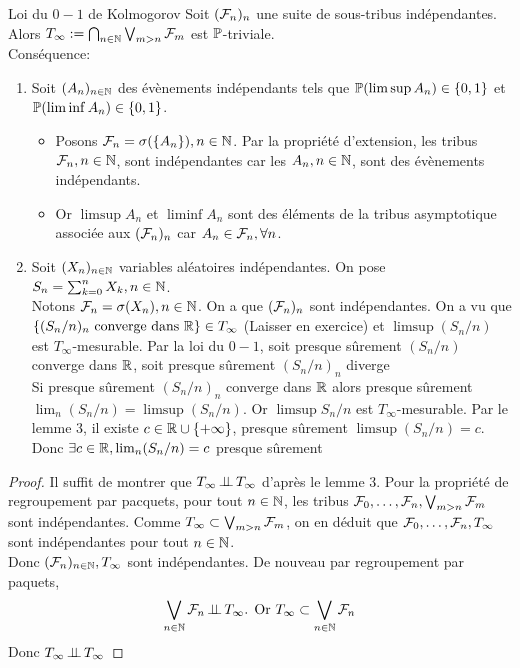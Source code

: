 \documentclass[]{report}
\begin{document}
    \begin{prop}{Loi du $0-1$ de Kolmogorov}{}
        Soit $(\mathcal{F}_n)_n$ une suite de sous-tribus indépendantes. Alors $T_\infty:=\bigcap_{n\in \mathbb{N}} \bigvee_{m>n} \mathcal{F}_m$ est $\mathbb{P}$-triviale.\\
        Conséquence: \begin{enumerate}
            \item Soit $(A_n)_{n\in\mathbb{N}}$ des évènements indépendants tels que $\mathbb{P}(\limsup A_n)\in \{0,1\}$ et $\mathbb{P}(\liminf A_n)\in \{0,1\}$.
            \begin{itemize}
                \item Posons $\mathcal{F}_n=\sigma(\{A_n\}),{n\in\mathbb{N}}$. Par la propriété d'extension, les tribus $\mathcal{F}_n,{n\in\mathbb{N}}$, sont indépendantes car les $A_n,{n\in\mathbb{N}}$, sont des évènements indépendants.
                \item Or $\limsup A_n$ et $\liminf A_n$ sont des éléments de la tribus asymptotique associée aux $(\mathcal{F}_n)_n$ car $A_n\in \mathcal{F}_n,\forall n$.
            \end{itemize}
            \item Soit $(X_n)_{n\in\mathbb{N}}$ variables aléatoires indépendantes. On pose $S_n=\sum_{k=0}^{n}X_k,{n\in\mathbb{N}}$.\\
            Notons $\mathcal{F}_n=\sigma(X_n),{n\in\mathbb{N}}$. On a que $(\mathcal{F}_n)_n$ sont indépendantes. On a vu que $\{(S_n/n)_n\text{ converge dans $\mathbb{R}$}\}\in T_\infty$ (Laisser en exercice) et $\limsup (S_n/n)$ est $T_\infty$-mesurable. Par la loi du $0-1$, soit presque sûrement $(S_n/n)$ converge dans $\mathbb{R}$, soit presque sûrement $(S_n/n)_n$ diverge\\
            Si presque sûrement $(S_n/n)_n$ converge dans $\mathbb{R}$ alors presque sûrement $\lim_n (S_n/n)=\limsup(S_n/n)$. Or $\limsup S_n/n$  est $T_\infty$-mesurable. Par le lemme 3, il existe $c\in \mathbb{R}\cup\{+\infty\}$, presque sûrement $\limsup(S_n/n)=c$. Donc $\exists c\in \mathbb{R},\lim_n (S_n/n)=c$ presque sûrement
        \end{enumerate}
    \end{prop}

    \begin{proof}
        Il suffit de montrer que $T_\infty\operatorname{\perp \!\!\! \perp} T_\infty$ d'après le lemme 3. Pour la propriété de regroupement par pacquets, pour tout $n\in \mathbb{N}$, les tribus $\mathcal{F}_0,\ldots,\mathcal{F}_n,\bigvee_{m>n}\mathcal{F}_m$ sont indépendantes. Comme $T_\infty\subset \bigvee_{m>n}\mathcal{F}_m$, on en déduit que $\mathcal{F}_0,\ldots,\mathcal{F}_n,T_\infty$ sont indépendantes pour tout ${n\in\mathbb{N}}$.\\
        Donc $(\mathcal{F}_n)_{n\in\mathbb{N}},T_\infty$ sont indépendantes. De nouveau par regroupement par paquets,
        \[\bigvee_{n\in\mathbb{N}} \mathcal{F}_n\operatorname{\perp \!\!\! \perp} T_\infty\text{. Or } T_\infty\subset \bigvee_{n\in\mathbb{N}} \mathcal{F}_n\]
        Donc $T_\infty\operatorname{\perp \!\!\! \perp} T_\infty$
    \end{proof}
\end{document}

